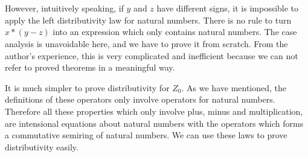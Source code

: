 \begin{code}
\\
\>[4]\<[19]%
\>[19]      \AgdaSymbol{(}  \AgdaSymbol{))} \AgdaSymbol{(} \AgdaSymbol{(}  \AgdaSymbol{)))))}\<%
\\
\>[13]\<[2]%
\>[2]\<%
\\
\>[0]\<[4]%
\>[4] \AgdaSymbol{:}          \AgdaSymbol{(}  \AgdaSymbol{(} \AgdaSymbol{))}  \AgdaSymbol{(}  \AgdaSymbol{)}\<%
\\
\>[0]\<[4]%
\>[4]   \AgdaSymbol{=}  \AgdaSymbol{(} \AgdaSymbol{\_)}\<%
\\
\>[0]\<[4]%
\>[4]  \AgdaSymbol{(} \AgdaSymbol{)} \AgdaSymbol{=} \<%
\\
\>[0]\<[4]%
\>[4]  \AgdaSymbol{(} \AgdaSymbol{)} \AgdaSymbol{=} \<%
\\
\end{code}


However, intuitively speaking, if $y$ and $z$ have different
signs, it is impossible to apply the left distributivity law for
natural numbers. 
There is no rule to turn $x *
(y  - z)$ into an expression which only contains natural numbers.
The case analysis is unavoidable here, and we have to prove it from scratch.
From the author's experience, this is very complicated and inefficient because we can not refer to proved theorems in a meaningful way. 

It is much simpler to prove distributivity for $Z_0$. As we have mentioned, the definitions of 
these operators only involve operators for natural
numbers. Therefore all these properties which only
involve plus, minus and multiplication, are intensional equations about natural numbers with the operators which forms a commutative semiring of natural numbers. 
We can use these laws to prove distributivity easily.

